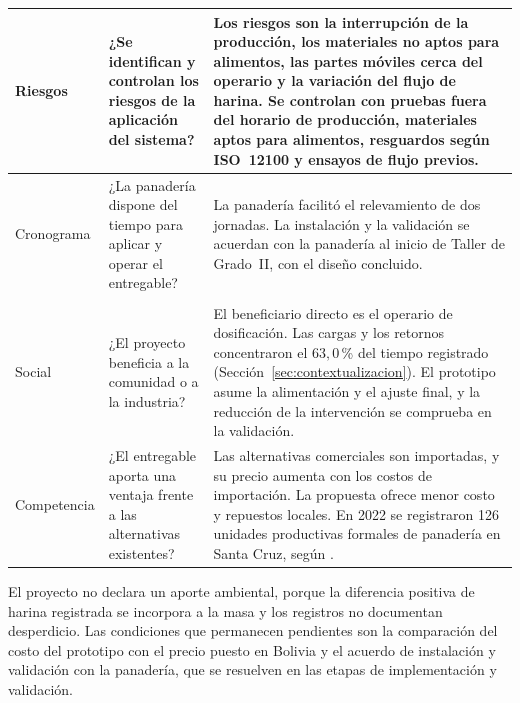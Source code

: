 {\begin{xltabular}{\textwidth}{
    >{\raggedright\arraybackslash}p{0.14\textwidth}
    >{\raggedright\arraybackslash}p{0.26\textwidth}
    >{\raggedright\arraybackslash}X}
    Riesgos &
    ¿Se identifican y controlan los riesgos de la aplicación del sistema? &
    Los riesgos son la interrupción de la producción, los materiales no aptos
    para alimentos, las partes móviles cerca del operario y la variación del
    flujo de harina. Se controlan con pruebas fuera del horario de
    producción, materiales aptos para alimentos, resguardos según ISO~12100 y
    ensayos de flujo previos. \\
    \midrule

    Cronograma &
    ¿La panadería dispone del tiempo para aplicar y operar el entregable? &
    La panadería facilitó el relevamiento de dos jornadas. La instalación y
    la validación se acuerdan con la panadería al inicio de Taller de
    Grado~II, con el diseño concluido. \\
    \midrule[1pt]

     \\
    \midrule

    Social &
    ¿El proyecto beneficia a la comunidad o a la industria? &
    El beneficiario directo es el operario de dosificación. Las cargas y los
    retornos concentraron el $63{,}0$\,\% del tiempo registrado
    (Sección~\ref{sec:contextualizacion}). El prototipo asume la alimentación
    y el ajuste final, y la reducción de la intervención se comprueba en la
    validación. \\
    \midrule

    Competencia &
    ¿El entregable aporta una ventaja frente a las alternativas existentes? &
    Las alternativas comerciales son importadas, y su precio aumenta con los
    costos de importación. La propuesta ofrece menor costo y repuestos
    locales. En 2022 se registraron 126 unidades productivas formales de
    panadería en Santa Cruz, según \textcite{mdpyep2023trigo}. \\
\end{xltabular}
}

El proyecto no declara un aporte ambiental, porque la diferencia positiva de
harina registrada se incorpora a la masa y los registros no documentan
desperdicio. Las condiciones que permanecen pendientes son la comparación del
costo del prototipo con el precio puesto en Bolivia y el acuerdo de
instalación y validación con la panadería, que se resuelven en las etapas de
implementación y validación.
